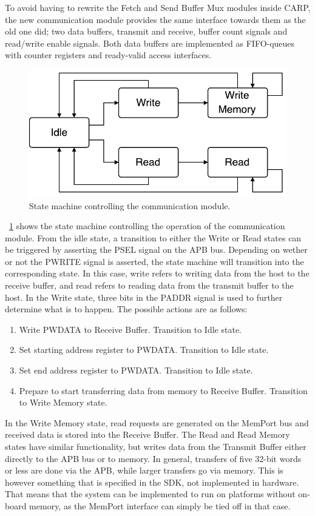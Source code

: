 To avoid having to rewrite the Fetch and Send Buffer Mux modules inside CARP,
the new communication module provides the same interface towards them as the old
one did; two data buffers, transmit and receive, buffer count signals and
read/write enable signals. Both data buffers are implemented as FIFO-queues with
counter registers and ready-valid access interfaces.

\begin{figure}[ht]
  \centering
  \includegraphics[width=0.5\linewidth]{fig/comm-fsm}
  \caption{State machine controlling the communication module.}
  \label{fig:comm-fsm}
\end{figure}

\figurename~\ref{fig:comm-fsm} shows the state machine controlling the operation
of the communication module. From the idle state, a transition to either the
Write or Read states can be triggered by asserting the PSEL signal on the APB
bus. Depending on wether or not the PWRITE signal is asserted, the state machine
will transition into the corresponding state. In this case, write refers to
writing data from the host to the receive buffer, and read refers to reading
data from the transmit buffer to the host. In the Write state, three bits in the
PADDR signal is used to further determine what is to happen. The possible
actions are as follows:

\begin{enumerate}
\item Write PWDATA to Receive Buffer. Transition to Idle state.
\item Set starting address register to PWDATA. Transition to Idle state.
\item Set end address register to PWDATA. Transition to Idle state.
\item Prepare to start transferring data from memory to Receive Buffer.
  Transition to Write Memory state.
\end{enumerate}

In the Write Memory state, read requests are generated on the MemPort bus and
received data is stored into the Receive Buffer. The Read and Read Memory states
have similar functionality, but writes data from the Transmit Buffer either
directly to the APB bus or to memory. In general, transfers of five 32-bit words
or less are done via the APB, while larger transfers go via memory. This is
however something that is specified in the SDK, not implemented in hardware.
That means that the system can be implemented to run on platforms without
on-board memory, as the MemPort interface can simply be tied off in that case.

